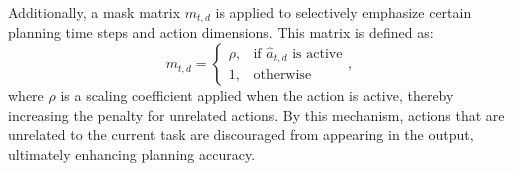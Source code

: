 Additionally, a mask matrix \( m_{t,d} \) is applied to selectively emphasize certain planning time steps and action dimensions. This matrix is defined as:
\begin{equation}
      m_{t,d} = \begin{cases}
    \rho , & \text{if } \hat{a}_{t,d} \text{ is active} \\
    1 , & \text{otherwise}
  \end{cases},
\end{equation}
where \( \rho \) is a scaling coefficient applied when the action is active, thereby increasing the penalty for unrelated actions. By this mechanism, actions that are unrelated to the current task are discouraged from appearing in the output, ultimately enhancing planning accuracy.



